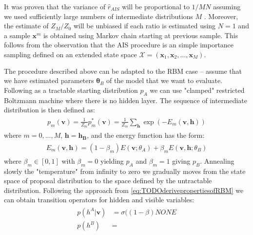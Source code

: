 \documentclass[../report/report.tex]{subfiles}
\begin{document}
It was proven that the variance of $\hat{r}_{AIS}$ will be proportional to $1 / MN$ assuming we used sufficiently large numbers of intermediate distributions $M$ \cite{neal2001annealed}. Moreover, the estimate of $Z_M / Z_0$ will be unbiased if each ratio is estimated using $N=1$ and a sample $\mathbf{x}^{m}$ is obtained using Markov chain starting at previous sample. This follows from the observation that the AIS procedure is an simple importance sampling defined on an extended state space $\mathcal{X} = (\mathbf{x}_1, \mathbf{x}_2, ..., \mathbf{x}_M)$.

The procedure described above can be adapted to the RBM case -- assume that we have estimated parameters $\mathbf{\theta}_B$ of the model that we want to evaluate. Following \cite{salakhutdinov2008quantitative} as a tractable starting distribution $p_A$ we can use "clamped" restricted Boltzmann machine where there is no hidden layer. The sequence of intermediate distribution is then defined as:
 \begin{align}
\begin{split}
p_m(\mathbf{v}) = \frac{1}{Z_m}p^*_m(\mathbf{v}) = \frac{1}{Z_m}\sum_\mathbf{h} \exp(-E_m(\mathbf{v, h}))
\end{split}
\end{align}
where $m = 0, ..., M$, $\mathbf{h} = \mathbf{h_B}$, and the energy function has the form:
 \begin{align}
\begin{split}
E_m(\mathbf{v,h}) = (1- \beta_m) E(\mathbf{v} ;\theta_A) + \beta_m E(\mathbf{v, h} ;\theta_B) 
\end{split}
\end{align}
where $\beta_m \in [0, 1]$ with $\beta_m = 0$ yielding $p_A$ and $\beta_m = 1$ giving $p_B$. Annealing slowly the "temperature" from infinity to zero we  gradually moves from the state space of proposal distribution to the space defined by the untractable distribution. Following the approach from \ref{eq:TODOderivepropertiesofRBM} we can obtain transition operators for hidden and visible variables:
 \begin{align}
\begin{split}
p(h^A | \mathbf{v}) & = \sigma ((1 - \beta) NONE \\
p(h^B) & =
\end{split}
\end{align}
\end{document}
